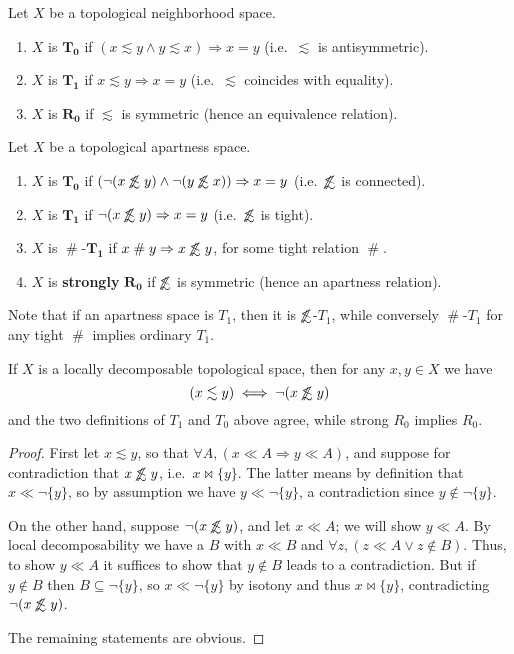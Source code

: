 \documentclass{article}
\def\apart{\mathrel{\#}}
\def\oapt{\mathrel{\!\not\,\not\lesssim}}
\def\leapx{\lesssim}
\def\cpl#1{\neg #1}
\let\implies\Rightarrow
\def\singleton#1{\{#1\}}
\begin{document}
\begin{defn}
  Let $X$ be a topological neighborhood space.
  \begin{enumerate}
  \item $X$ is $\mathbf{T_0}$ if $(x\leapx y \land y\leapx x) \implies x=y$ (i.e.\ $\leapx$ is antisymmetric).
  \item $X$ is $\mathbf{T_1}$ if $x\leapx y \implies x=y$ (i.e.\ $\leapx$ coincides with equality).
  \item $X$ is $\mathbf{R_0}$ if $\leapx$ is symmetric (hence an equivalence relation).
  \end{enumerate}
  Let $X$ be a topological apartness space.
  \begin{enumerate}
  \item $X$ is $\mathbf{T_0}$ if $(\neg(x\oapt y) \land \neg(y\oapt x)) \implies x=y$ (i.e.\ $\oapt$ is connected).
  \item $X$ is $\mathbf{T_1}$ if $\neg(x\oapt y)\implies x=y$ (i.e.\ $\oapt$ is tight).
  \item $X$ is $\apart$-$\mathbf{T_1}$ if $x\apart y \implies x\oapt y$, for some tight relation $\apart$.
  \item $X$ is \textbf{strongly} $\mathbf{R_0}$ if $\oapt$ is symmetric (hence an apartness relation).
  \end{enumerate}
\end{defn}

Note that if an apartness space is $T_1$, then it is $\oapt$-$T_1$, while conversely $\apart$-$T_1$ for any tight $\apart$ implies ordinary $T_1$.

\begin{thm}
  If $X$ is a locally decomposable topological space, then for any $x,y\in X$ we have
  \[ (x\leapx y) \iff \neg(x\oapt y) \]
  and the two definitions of $T_1$ and $T_0$ above agree, while strong $R_0$ implies $R_0$.
\end{thm}
\begin{proof}
  First let $x\leapx y$, so that $\forall A, (x\ll A \implies y\ll A)$, and suppose for contradiction that $x\oapt y$, i.e.\ $x\bowtie \singleton{y}$.
  The latter means by definition that $x\ll \cpl{\singleton{y}}$, so by assumption we have $y\ll \cpl{\singleton{y}}$, a contradiction since $y\notin \cpl{\singleton{y}}$.

  On the other hand, suppose $\neg(x\oapt y)$, and let $x\ll A$; we will show $y\ll A$.
  By local decomposability we have a $B$ with $x\ll B$ and $\forall z, (z\ll A \lor z\notin B)$.
  Thus, to show $y\ll A$ it suffices to show that $y\notin B$ leads to a contradiction.
  But if $y\notin B$ then $B\subseteq \cpl{\singleton{y}}$, so $x\ll \cpl{\singleton{y}}$ by isotony and thus $x\bowtie \singleton{y}$, contradicting $\neg(x\oapt y)$.

  The remaining statements are obvious.
\end{proof}
\end{document}
